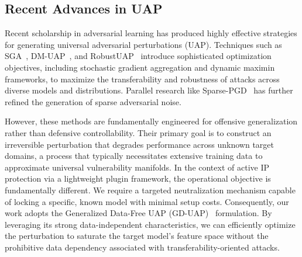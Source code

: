 \documentclass[conference]{IEEEtran}
\begin{document}
\subsection{Recent Advances in UAP}
Recent scholarship in adversarial learning has produced highly effective strategies for generating universal adversarial perturbations (UAP). Techniques such as SGA~\cite{liu2023enhancing}, DM-UAP~\cite{zhang2025improving}, and RobustUAP~\cite{xu2022robust} introduce sophisticated optimization objectives, including stochastic gradient aggregation and dynamic maximin frameworks, to maximize the transferability and robustness of attacks across diverse models and distributions. Parallel research like Sparse-PGD~\cite{zhong2024sparse} has further refined the generation of sparse adversarial noise. 

However, these methods are fundamentally engineered for offensive generalization rather than defensive controllability. Their primary goal is to construct an irreversible perturbation that degrades performance across unknown target domains, a process that typically necessitates extensive training data to approximate universal vulnerability manifolds. In the context of active IP protection via a lightweight plugin framework, the operational objective is fundamentally different. We require a targeted neutralization mechanism capable of locking a specific, known model with minimal setup costs. Consequently, our work adopts the Generalized Data-Free UAP (GD-UAP)~\cite{mopuri2018generalizable} formulation. By leveraging its strong data-independent characteristics, we can efficiently optimize the perturbation to saturate the target model's feature space without the prohibitive data dependency associated with transferability-oriented attacks.
\end{document}
